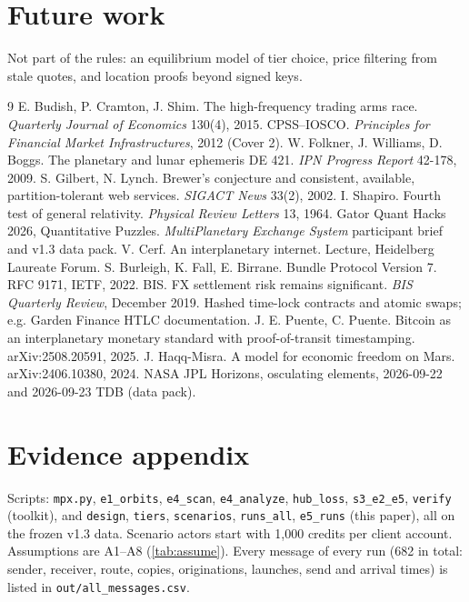 \documentclass[11pt]{article}
\theoremstyle{definition}
\theoremstyle{remark}
\begin{document}
\section{Future work}\label{sec:future}
Not part of the rules: an equilibrium model of tier choice, price filtering from stale quotes, and location proofs beyond signed keys.

\begin{thebibliography}{9}\small
{} E. Budish, P. Cramton, J. Shim. The high-frequency trading arms race. \emph{Quarterly Journal of Economics} 130(4), 2015.
 CPSS--IOSCO. \emph{Principles for Financial Market Infrastructures}, 2012 (Cover 2).
 W. Folkner, J. Williams, D. Boggs. The planetary and lunar ephemeris DE 421. \emph{IPN Progress Report} 42-178, 2009.
 S. Gilbert, N. Lynch. Brewer's conjecture and consistent, available, partition-tolerant web services. \emph{SIGACT News} 33(2), 2002.
 I. Shapiro. Fourth test of general relativity. \emph{Physical Review Letters} 13, 1964.
 Gator Quant Hacks 2026, Quantitative Puzzles. \emph{MultiPlanetary Exchange System} participant brief and v1.3 data pack.
 V. Cerf. An interplanetary internet. Lecture, Heidelberg Laureate Forum.
 S. Burleigh, K. Fall, E. Birrane. Bundle Protocol Version 7. RFC 9171, IETF, 2022.
 BIS. FX settlement risk remains significant. \emph{BIS Quarterly Review}, December 2019.
 Hashed time-lock contracts and atomic swaps; e.g. Garden Finance HTLC documentation.
 J. E. Puente, C. Puente. Bitcoin as an interplanetary monetary standard with proof-of-transit timestamping. arXiv:2508.20591, 2025.
 J. Haqq-Misra. A model for economic freedom on Mars. arXiv:2406.10380, 2024.
 NASA JPL Horizons, osculating elements, 2026-09-22 and 2026-09-23 TDB (data pack).
\end{thebibliography}
\clearpage
\appendix
\section*{Evidence appendix}
\small
Scripts: \texttt{mpx.py}, \texttt{e1\_orbits}, \texttt{e4\_scan}, \texttt{e4\_analyze}, \texttt{hub\_loss}, \texttt{s3\_e2\_e5}, \texttt{verify} (toolkit), and \texttt{design}, \texttt{tiers}, \texttt{scenarios}, \texttt{runs\_all}, \texttt{e5\_runs} (this paper), all on the frozen v1.3 data. Scenario actors start with 1{,}000 credits per client account. Assumptions are A1--A8 (\cref{tab:assume}). Every message of every run (682 in total: sender, receiver, route, copies, originations, launches, send and arrival times) is listed in \texttt{out/all\_messages.csv}.
\end{document}
